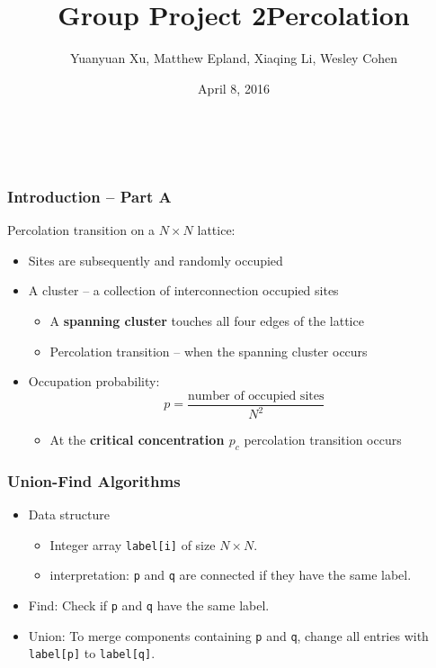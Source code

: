 \documentclass[mathserif,18pt,xcolor=table]{beamer}
\title[Group Project 2]{Group Project 2\newline Percolation}
\author[Xu, Epland, Li, Cohen]{{\small Yuanyuan Xu, Matthew Epland, Xiaqing Li, Wesley Cohen}}
\institute{Duke University}
\date{April 8, 2016}
\begin{document}
\beamertemplateballitem
\frame{\titlepage}

\


\begin{frame}
	\frametitle{Introduction -- Part A}
	Percolation transition on a $N\times N$ lattice:
	\begin{itemize}
		\item Sites are subsequently and randomly occupied
		\item A cluster -- a collection of interconnection occupied sites
		\begin{itemize}
			\item A \textbf{spanning cluster} touches all four edges of the lattice
			\item Percolation transition -- when the spanning cluster occurs
		\end{itemize}
		\item Occupation probability: 
			\begin{equation}
			p=\frac{\text{number of occupied sites}}{N^2}
			\end{equation}
		\begin{itemize}
			\item At the \textbf{critical concentration $p_c$} percolation transition occurs
		\end{itemize}
	\end{itemize}
\end{frame}


\begin{frame}
	\frametitle{Union-Find Algorithms}
	\begin{itemize}
		\item Data structure
			\begin{itemize}
			\item Integer array {\tt label[i]} of size $N\times N$.
			\item interpretation: {\tt p} and {\tt q} are connected if they have the same label.
			\end{itemize}
		\item Find: Check if {\tt p} and {\tt q} have the same label.
		\item Union: To merge components containing {\tt p} and {\tt q}, change all entries with {\tt label[p]} to {\tt label[q]}.
	\end{itemize}
\end{frame}
\end{document}
